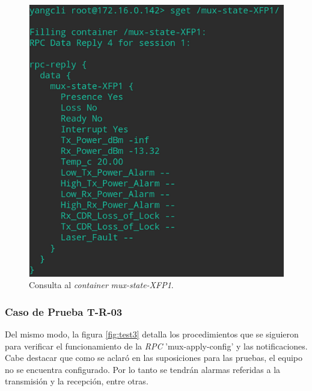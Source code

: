   \begin{figure}[H]
	\centering
	\includegraphics[scale=0.6]{Figures/test2_consulta.png}
	\caption{Consulta al \textit{container} \textit{mux-state-XFP1}.}
	\label{fig:test2_consulta}
  \end{figure}


  \subsubsection{Caso de Prueba T-R-03}
  Del mismo modo, la figura \ref{fig:test3} detalla los procedimientos que se siguieron para verificar el funcionamiento de la  \textit{RPC} 'mux-apply-config' y las notificaciones. Cabe destacar que como se aclaró en las suposiciones para las pruebas, el equipo no se encuentra configurado. Por lo tanto se tendrán alarmas referidas a la transmisión y la recepción, entre otras. 


